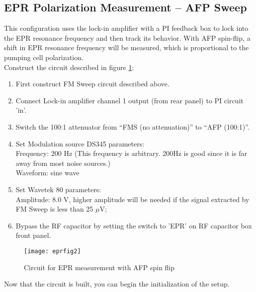 \subsection{EPR Polarization Measurement -- AFP Sweep}
\label{sec:eprafp}
This configuration uses the lock-in amplifier with a PI feedback 
box to lock into the EPR resonance frequency and then track its
behavior. With AFP spin-flip, a shift in EPR resonance frequency 
will be measured, which is proportional to the pumping cell polarization.\\

Construct the circuit described in figure \ref{fig2:epr}:

\begin{enumerate}

\item First construct FM Sweep circuit described above.

\item Connect Lock-in amplifier channel 1 output (from rear panel) to PI circuit 'in'.

\item Switch the 100:1 attenuator from ``FMS (no attenuation)'' to 
``AFP (100:1)''.
\item Set Modulation source DS345 parameters:\\
\indent     Frequency: 200 Hz (This frequency is arbitrary.  200Hz is good 
since it is far away from most noise sources.)\\
\indent     Waveform:  sine wave
\item Set Wavetek 80 parameters:\\
\indent Amplitude: 8.0 V, higher amplitude will be needed if the signal extracted by FM Sweep is less
than 25 $\mu$V;\\

\item Bypass the RF capacitor by setting the switch to 'EPR' 
on RF capacitor box front panel.
\end{enumerate}

\begin{figure}
\begin{center}
\centerline{ \texttt{[image: eprfig2]}}
\caption{Circuit for EPR measurement with AFP spin flip}
\end{center}
\label{fig2:epr}
\end{figure}


Now that the circuit is built, you can begin the initialization of the
setup.

